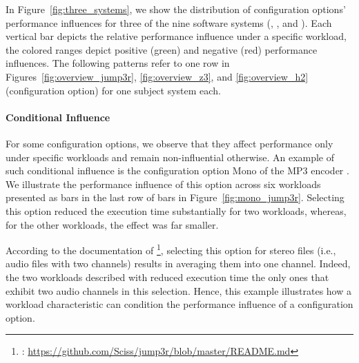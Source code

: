 {{{{In Figure~\ref{fig:three_systems}, we show the distribution of configuration options' performance influences for three of the nine software systems (\jumper, \zdrei, and \htwo). {\color{black}Each vertical bar depicts the relative performance influence under a specific workload, the colored ranges depict positive (green) and negative (red) performance influences. The following patterns refer to one row in Figures~\ref{fig:overview_jump3r}, \ref{fig:overview_z3}, and \ref{fig:overview_h2} (configuration option) for one subject system each.}

\paragraph{Conditional Influence}\label{sec:conditional_influence} For some configuration options, we observe that they affect performance only under specific workloads and remain non-influential otherwise. An example of such conditional influence is the configuration option \textsf{Mono} of the MP3 encoder \jumper. We illustrate the performance influence of this option across six workloads presented as bars in the last row of bars in Figure~\ref{fig:mono_jump3r}. Selecting this option reduced the execution time substantially for two workloads, whereas, for the other workloads, the effect was far smaller.

According to the documentation of \jumper\footnote{\jumper: \url{https://github.com/Sciss/jump3r/blob/master/README.md}}, selecting this option for stereo files (i.e., audio files with two channels) results in averaging them into one channel. Indeed, the two workloads described with reduced execution time the only ones that exhibit two audio channels in this selection. Hence, this example illustrates how a workload  characteristic can condition the performance influence of a configuration option. 

}}}}
